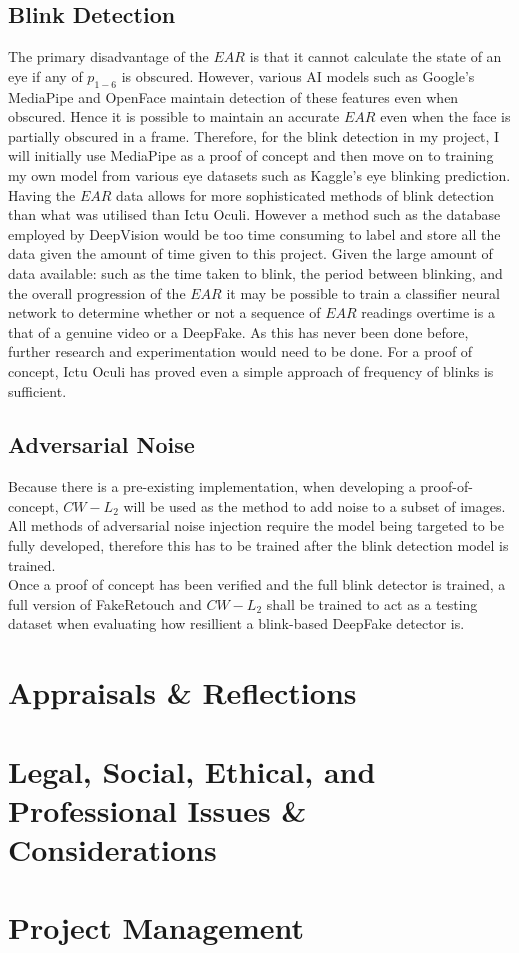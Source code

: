 \documentclass{article}
\begin{document}
\subsection{Blink Detection} \label{sec:future-blink}

The primary disadvantage of the $EAR$ is that it cannot calculate the state of an eye if any of $p_{1-6}$ is obscured\cite{ictuoculi}. However, various AI models such as Google's MediaPipe \cite{mediapipe} and OpenFace\cite{openface} maintain detection of these features even when obscured. Hence it is possible to maintain an accurate $EAR$ even when the face is partially obscured in a frame. Therefore, for the blink detection in my project, I will initially use MediaPipe as a proof of concept and then move on to training my own model from various eye datasets such as Kaggle's eye blinking prediction\cite{eyeblinkprediction}.\\

Having the $EAR$ data allows for more sophisticated methods of blink detection than what was utilised than Ictu Oculi. However a method such as the database employed by DeepVision\cite{blinking-pattern} would be too time consuming to label and store all the data given the amount of time given to this project. Given the large amount of data available: such as the time taken to blink, the period between blinking, and the overall progression of the $EAR$ it may be possible to train a classifier neural network to determine whether or not a sequence of $EAR$ readings overtime is a that of a genuine video or a DeepFake. As this has never been done before, further research and experimentation would need to be done. For a proof of concept, Ictu Oculi has proved even a simple approach of frequency of blinks is sufficient\cite{ictuoculi}.

\subsection{Adversarial Noise} \label{sec:future-noise}

Because there is a pre-existing implementation\cite{cwl2python}, when developing a proof-of-concept, $CW-L_2$ will be used as the method to add noise to a subset of images. All methods of adversarial noise injection require the model being targeted to be fully developed, therefore this has to be trained after the blink detection model is trained.\\

Once a proof of concept has been verified and the full blink detector is trained, a full version of FakeRetouch and $CW-L_2$ shall be trained to act as a testing dataset when evaluating how resillient a blink-based DeepFake detector is.

\section{Appraisals \& Reflections}

\section{Legal, Social, Ethical, and Professional Issues \& Considerations}

\section{Project Management}



\end{document}
